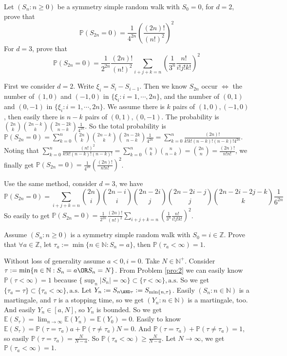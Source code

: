 \documentclass{ctexart}
\begin{document}
\begin{problem}\label{pro:3}
  Let \((S_n:n \geq 0)\) be a symmetry simple random walk with \(S_0=0\), for \(d=2\), prove that
  \[
    \mathbb{P}(S_{2n}=0)=\frac{1}{4^{2n}}\left(\frac{(2n)!}{(n!)^2}\right)^2
  \]
  For \(d=3\), prove that
  \[
    \mathbb{P}(S_{2n}=0)=\frac{1}{2^{2n}}\frac{(2n)!}{(n!)^2}\sum_{i + j + k = n} \left(\frac{1}{3^n}\frac{n!}{i!j!k!}\right)^2
  \]
\end{problem}
\begin{solution}
  First we consider \(d=2\). Write \(\xi_i=S_i-S_{i-1}\).
  Then we know \(S_{2n}\) occur \(\iff\) the number of \((1,0)\) and \((-1,0)\) in \(\{\xi_i:i=1,\cdots,2n\}\),
  and the number of \((0,1)\) and \((0,-1)\) in \(\{\xi_i:i=1,\cdots,2n\}\).
  We assume there is \(k\) pairs of \((1,0),(-1,0)\), then easily there is \(n-k\) pairs of \((0,1),(0,-1)\).
  The probability is \(\binom{2n}{k}\binom{2n-k}{k}\binom{2n-2k}{n-k}\frac{1}{4^{2n}}\).
  So the total probability is
  \(\mathbb{P}(S_{2n}=0)=\sum_{k=0}^{n}\binom{2n}{k}\binom{2n-k}{k}\binom{2n-2k}{n-k}\frac{1}{4^{2n}}=\sum_{k=0}^{n}\frac{(2n)!}{k!k!(n-k)!(n-k)!4^{2n}}\).
  Noting that \(\sum_{k=0}^{n}\frac{(n!)^2}{k!k!(n-k)!(n-k)!}=\sum_{k=0}^{n}\binom{n}{k}\binom{n}{n-k}=\binom{2n}{n}=\frac{(2n)!}{n!n!}\),
  we finally get \(\mathbb{P}(S_{2n}=0)=\frac{1}{4^{2n}}\left(\frac{(2n)!}{n!n!}\right)^2\).

  Use the same method, consider \(d=3\), we have
  \[
    \mathbb{P}(S_{2n}=0)=\sum_{i+j+k=n} \binom{2n}{i}\binom{2n-i}{i}\binom{2n-2i}{j}\binom{2n-2i-j}{j}\binom{2n-2i-2j-k}{k} \frac{1}{6^{2n}}
  \]
  So easily to get \(\mathbb{P}(S_{2n}=0)=\frac{1}{2^{2n}}\frac{(2n)!}{(n!)^2}\sum_{i + j + k = n} \left(\frac{1}{3^n}\frac{n!}{i!j!k!}\right)^2\).
\end{solution}

\begin{problem}\label{pro:4}
  Assume \((S_n:n \geq 0)\) is a symmetry simple random walk with \(S_0 = i \in \mathbb{Z}\).
  Prove that \(\forall a \in \mathbb{Z}\), let \(\tau_a:=\min\{n \in \mathbb{N}:S_n=a \}\), then \(\mathbb{P}(\tau_a < \infty) = 1 \).
\end{problem}
\begin{solution}
  Without loss of generality assume \(a<0,i=0\). Take \(N \in \mathbb{N}^+\). Consider \(\tau:=\min\{n \in \mathbb{N}:S_n=a \OR S_n=N\}\).
  From Problem \ref{pro:2} we can easily know \(\mathbb{P}(\tau < \infty)=1\) because \(\{\sup_n|S_n|=\infty\}\subset \{\tau<\infty\},\text{a.s.}\)
  So we get \(\{\tau_a = \tau\} \subset \{\tau_a<\infty\},\text{a.s.}\)
  Let \(Y_n:=S_{n \AND \tau}:=S_{\min\{n,\tau\}}\).
  Easily \((S_n:n \in \mathbb{N})\) is a martingale, and \(\tau\) is a stopping time, so we get
  \((Y_n:n \in \mathbb{N})\) is a martingale, too.
  And easily \(Y_n \in [a,N]\), so \(Y_n\) is bounded.
  So we get \(\mathbb{E}(S_{\tau})=\lim_{n \to \infty}\mathbb{E}(Y_n)=\mathbb{E}(Y_0)=0\).
  Easily to know \(\mathbb{E}(S_{\tau})=\mathbb{P}(\tau=\tau_a)a+\mathbb{P}(\tau \neq \tau_a)N=0\).
  And \(\mathbb{P}(\tau=\tau_a)+\mathbb{P}(\tau \neq \tau_a)=1\),
  so easily \(\mathbb{P}(\tau=\tau_a)=\frac{N}{N-a}\).
  So \(\mathbb{P}(\tau_a<\infty)\geq \frac{N}{N-a}\).
  Let \(N \to \infty\), we get \(\mathbb{P}(\tau_a<\infty)=1\).
\end{solution}
\end{document}
